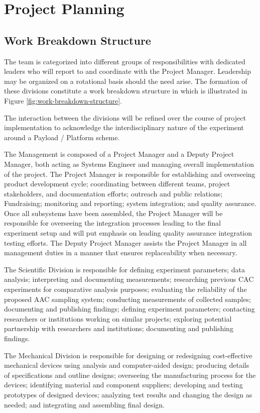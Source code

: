 \documentclass[a4paper,12pt,oneside]{article} %
\begin{document}
\pagebreak
\section{Project Planning}

\subsection{Work Breakdown Structure}

The team is categorized into different groups of responsibilities with dedicated leaders who will report to and coordinate with the Project Manager. Leadership may be organized on a rotational basis should the need arise. The formation of these divisions constitute a work breakdown structure in which is illustrated in Figure \ref{fig:work-breakdown-structure}.


The interaction between the divisions will be refined over the course of project implementation to acknowledge the interdisciplinary nature of the experiment around a Payload / Platform scheme.

The Management is composed of a Project Manager and a Deputy Project Manager, both acting as Systems Engineer and managing overall implementation of the project. The Project Manager is responsible for establishing and overseeing product development cycle; coordinating between different teams, project stakeholders, and documentation efforts; outreach and public relations; Fundraising; monitoring and reporting; system integration; and quality assurance. Once all subsystems have been assembled, the Project Manager will be responsible for overseeing the integration processes leading to the final experiment setup and will put emphasis on leading quality assurance integration testing efforts. The Deputy Project Manager assists the Project Manager in all management duties in a manner that ensures replaceability when necessary.

The Scientific Division is responsible for defining experiment parameters; data analysis; interpreting and documenting measurements; researching previous CAC experiments for comparative analysis purposes; evaluating the reliability of the proposed AAC sampling system; conducting measurements of collected samples; documenting and publishing findings; defining experiment parameters; contacting researchers or institutions working on similar projects; exploring potential partnership with researchers and institutions; documenting and publishing findings.

The Mechanical Division is responsible for designing or redesigning cost-effective mechanical devices using analysis and computer-aided design; producing details of specifications and outline designs; overseeing the manufacturing process for the devices; identifying material and component suppliers; developing and testing prototypes of designed devices; analyzing test results and changing the design as needed; and integrating and assembling final design.
\end{document}

